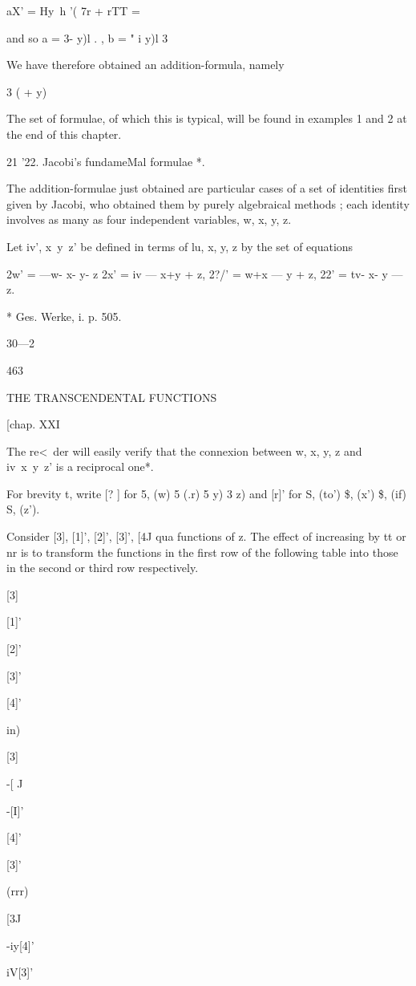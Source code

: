 aX' = Hy\ h '( 7r + rTT = %

and so a = 3- y)l . , b = " i y)l 3\

We have therefore obtained an addition-formula, namely

 3 ( + y) %

The set of formulae, of which this is typical, will be found in
examples 1 and 2 at the end of this chapter.

21 '22. Jacobi's fundameMal formulae *.

The addition-formulae just obtained are particular cases of a set of
identities first given by Jacobi, who obtained them by purely
algebraical methods ; each identity involves as many as four
independent variables, w, x, y, z.

Let iv', x\ y\ z' be defined in terms of lu, x, y, z by the set of
equations

2w' = —w- x- y- z 2x' = iv — x+y + z, 2?/' = w+x — y + z, 22' = tv- x-
y — z.

* Ges. Werke, i. p. 505.

30—2

463

THE TRANSCENDENTAL FUNCTIONS

[chap. XXI

The re<\ der will easily verify that the connexion between w, x, y, z
and iv\ x\ y\ z' is a reciprocal one*.

For brevity t, write [? ] for 5, (w) 5 (.r) 5 y) 3 z) and [r]' for S,
(to') \$, (x') \$, (if) S, (z').

Consider [3], [1]', [2]', [3]', [4J qua functions of z. The effect of
increasing by tt or nr is to transform the functions in the first row
of the following table into those in the second or third row
respectively.

[3]

[1]'

[2]'

[3]'

[4]'

in)

[3]

-[ J

-[I]'

[4]'

[3]'

(rrr)

 [3J

-iy[4]'

iV[3]'

